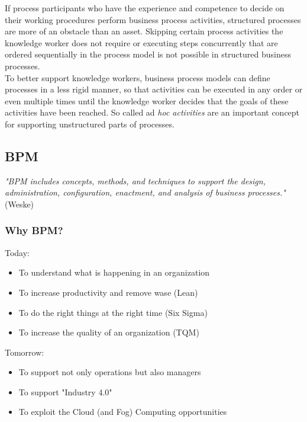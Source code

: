 \documentclass[10pt,a4paper]{article}
\begin{document}
If process participants who have the experience and competence to decide on their working procedures perform business process activities, structured processes are more of an obstacle than an asset. Skipping certain process activities the knowledge worker does not require or executing steps concurrently that are ordered sequentially in the process model is not possible in structured business processes. \\ 
To better support knowledge workers, business process models can define processes in a less rigid manner, so that activities can be executed in any order or even multiple times until the knowledge worker decides that the goals of these activities have been reached. So called ad \textit{hoc activities} are an important concept for supporting unstructured parts of processes.
\subsection{BPM}
\textit{"BPM includes concepts, methods, and techniques to support the design, administration, configuration, enactment, and analysis of business processes."} (Weske)
\subsubsection{Why BPM?}
Today:
\begin{itemize}
	\item To understand what is happening in an organization
	\item To increase productivity and remove wase (Lean)
	\item To do the right things at the right time (Six Sigma)
	\item To increase the quality of an organization (TQM)
\end{itemize}
Tomorrow:
\begin{itemize}
	\item To support not only operations but also managers
	\item To support "Industry 4.0"
	\item To exploit the Cloud (and Fog) Computing opportunities
\end{itemize}
\end{document}
